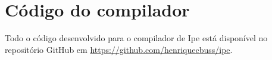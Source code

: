 \chapter{Código do compilador}
\label{apendix:code}

Todo o código desenvolvido para o compilador de Ipe está disponível no repositório GitHub
em \url{https://github.com/henriquecbuss/ipe}.
